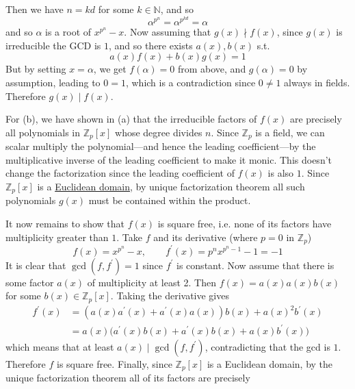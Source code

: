\begin{solution}
\begin{enumerate}
        Then we have $n = kd$ for some $k \in \mathbb{N}$, and so 
      \begin{equation}
        \alpha^{p^n} = \alpha^{p^{kd}} = \alpha
      \end{equation} 
      and so $\alpha$ is a root of $x^{p^n} - x$. Now assuming that $g(x) \nmid f(x)$, since $g(x)$ is irreducible the GCD is $1$, and so there exists $a(x), b(x)$ s.t. 
      \begin{equation}
        a(x) f(x) + b(x) g(x) = 1
      \end{equation}
      But by setting $x = \alpha$, we get $f(\alpha) = 0$ from above, and $g(\alpha) = 0$ by assumption, leading to $0 = 1$, which is a contradiction since $0 \neq 1$ always in fields. Therefore $g(x) \mid f(x)$. 
    \end{enumerate} 

    For (b), we have shown in (a) that the irreducible factors of $f(x)$ are precisely all polynomials in $\mathbb{Z}_p [x]$ whose degree divides $n$. Since $\mathbb{Z}_p$ is a field, we can scalar multiply the polynomial---and hence the leading coefficient---by the multiplicative inverse of the leading coefficient to make it monic. This doesn't change the factorization since the leading coefficient of $f(x)$ is also $1$. Since $\mathbb{Z}_p [x]$ is a \hyperref[def:euclidean-domain]{Euclidean domain}, by unique factorization theorem all such polynomials $g(x)$ must be contained within the product. 

    It now remains to show that $f(x)$ is square free, i.e. none of its factors have multiplicity greater than $1$. Take $f$ and its derivative (where $p = 0$ in $\mathbb{Z}_p$)
    \begin{equation}
      f(x) = x^{p^n} - x, \qquad f^\prime (x) = p^n x^{p^n - 1} - 1 = -1
    \end{equation}
    It is clear that $\gcd(f, f^\prime) = 1$ since $f^\prime$ is constant. Now assume that there is some factor $a(x)$ of multiplicity at least 2. Then $f(x) = a(x) a(x) b(x)$ for some $b(x) \in \mathbb{Z}_p [x]$. Taking the derivative gives 
    \begin{align}
      f^\prime (x) & = ( a(x) a^\prime (x) + a^\prime (x) a(x) ) b(x) + a(x)^2 b^\prime (x) \\
                   & =  a (x) \big( a^\prime (x) b(x) + a^\prime (x) b(x) + a(x) b^\prime (x) \big) 
    \end{align}
    which means that at least $a(x) \mid \gcd(f, f^\prime)$, contradicting that the gcd is $1$. Therefore $f$ is square free. Finally, since $\mathbb{Z}_p [x]$ is a Euclidean domain, by the unique factorization theorem all of its factors are precisely 
  \end{solution}
  

